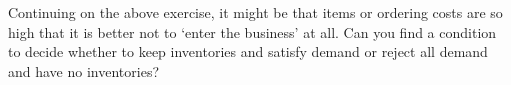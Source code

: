 \begin{exercise}
  Continuing on the above exercise, it might be that items or ordering
  costs are so high that it is better not to `enter the business' at
  all. Can you find a condition to decide whether to keep inventories
  and satisfy demand or reject all demand and have no inventories?
  \begin{comment}
    The cost rate of dropping all demand is $kD$. The cost rate of keeping inventories is, under the EOQ model,  and using that the optimal order quantity $Q^* = \sqrt{2AD/h}$, 
    \begin{equation*}
      \begin{split}
      f(Q^*)
 &= A \frac{D}{Q^*} + \frac h 2 Q \\
 &= A \frac{D}{\sqrt{2AD/h}} + \frac h 2 \sqrt{\frac{2AD}h} \\
 &= A D \sqrt{\frac{h} {2AD}} + \frac h 2 \sqrt{\frac{2AD}h} \\
 &=  \sqrt{\frac {AhD}{2}} + \sqrt\frac{ADh}2 \\
 &=  2\sqrt{\frac {AhD}{2}} \\
 &=  \sqrt{2AhD}.
      \end{split}
    \end{equation*}
When the cost rate of rejecting demand is lower than the cost rate of keeping inventories, we reject the demand, that is, when
\begin{equation*}
kD < \sqrt{2AhD}.
\end{equation*}
We can simplity this a bit to $k^2D^2 < 2AhD$, from which we get
\begin{equation*}
  k^2 D < 2 A h.
\end{equation*}
Thus, when the demand is really small, or the reject cost $k$ is
small, we reject demand. 
  \end{comment}
\end{exercise}


